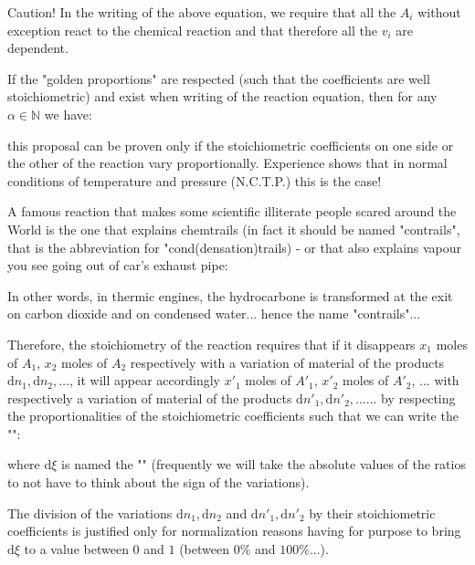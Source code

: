 	\begin{tcolorbox}[colback=red!5,borderline={1mm}{2mm}{red!5},arc=0mm,boxrule=0pt]
	\bcbombe Caution! In the writing of the above equation, we require that all the $A_i$ without exception react to the chemical reaction and that therefore all the $v_i$ are dependent.
	\end{tcolorbox}
	
	
	If the "golden proportions" are respected (such that the coefficients are well stoichiometric) and exist when writing of the reaction equation, then for any $\alpha \in \mathbb{N}$ we have:
	
	this proposal can be proven only if the stoichiometric coefficients on one side or the other of the reaction vary proportionally. Experience shows that in normal conditions of temperature and pressure (N.C.T.P.) this is the case!
	
	\begin{tcolorbox}[title=Remark,colframe=black,arc=10pt]
	A famous reaction that makes some scientific illiterate people scared around the World is the one that explains chemtrails (in fact it should be named "contrails", that is the abbreviation for "cond(densation)trails) - or that also explains vapour you see going out of car's exhaust pipe:
	
	In other words, in thermic engines, the hydrocarbone is transformed at the exit on carbon dioxide and on condensed water... hence the name "contrails"...
	\end{tcolorbox}
	
	Therefore, the stoichiometry of the reaction requires that if it disappears $x_1$ moles of $A_1$, $x_2$ moles of $A_2$  respectively with a variation of material of the products $\mathrm{d}n_1,\mathrm{d}n_2,\ldots $, it will appear accordingly ${x'}_1$ moles of ${A'}_1$, ${x'}_2$ moles of ${A'}_2$, ... with respectively a variation of material of the products $\mathrm{d}{n'}_1,\mathrm{d}{n'}_2,\ldots $... by respecting the proportionalities of the stoichiometric coefficients such that we can write the "":
	
	where $\mathrm{d}\xi$ is named the "" (frequently we will take the absolute values of the ratios to not have to think about the sign of the variations).
	
	The division of the variations $\mathrm{d}n_1,\mathrm{d}n_2$ and $\mathrm{d}{n'}_1,\mathrm{d}{n'}_2$  by their stoichiometric coefficients is justified only for normalization reasons having for purpose to bring $\mathrm{d}\xi$ to a value between $0$ and $1$ (between $0\%$ and $100\%$...).
	
